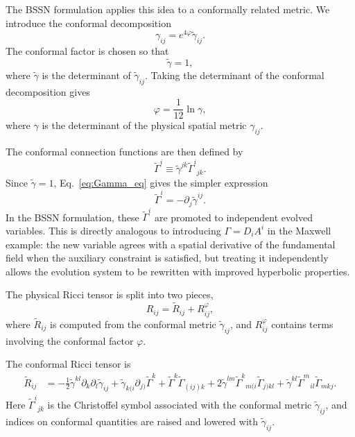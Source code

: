 The BSSN formulation applies this idea to a conformally related metric. We introduce the conformal decomposition
\begin{equation}
\gamma_{ij}
=
e^{4\varphi}\tilde{\gamma}_{ij}.
\end{equation}
The conformal factor is chosen so that
\begin{equation}
\tilde{\gamma}=1,
\end{equation}
where $\tilde{\gamma}$ is the determinant of $\tilde{\gamma}_{ij}$. Taking the determinant of the conformal decomposition gives
\begin{equation}
\varphi
=
\frac{1}{12}\ln\gamma,
\end{equation}
where $\gamma$ is the determinant of the physical spatial metric $\gamma_{ij}$.

The conformal connection functions are then defined by
\begin{equation}
\tilde{\Gamma}^i
\equiv
\tilde{\gamma}^{jk}\tilde{\Gamma}^i{}_{jk}.
\end{equation}
Since $\tilde{\gamma}=1$, Eq.~\eqref{eq:Gamma_eq} gives the simpler expression
\begin{equation}
\tilde{\Gamma}^i
=
-\partial_j\tilde{\gamma}^{ij}.
\end{equation}
In the BSSN formulation, these $\tilde{\Gamma}^i$ are promoted to independent evolved variables. This is directly analogous to introducing $\Gamma=D_iA^i$ in the Maxwell example: the new variable agrees with a spatial derivative of the fundamental field when the auxiliary constraint is satisfied, but treating it independently allows the evolution system to be rewritten with improved hyperbolic properties.

The physical Ricci tensor is split into two pieces,
\begin{equation}
R_{ij}
=
\tilde{R}_{ij}
+
R^{\varphi}_{ij},
\end{equation}
where $\tilde{R}_{ij}$ is computed from the conformal metric $\tilde{\gamma}_{ij}$, and $R^{\varphi}_{ij}$ contains terms involving the conformal factor $\varphi$.

The conformal Ricci tensor is
\begin{equation}
\begin{aligned}
\tilde{R}_{ij}
&=
-\frac{1}{2}\tilde{\gamma}^{kl}
\partial_k\partial_l \tilde{\gamma}_{ij}
+
\tilde{\gamma}_{k(i}\partial_{j)}\tilde{\Gamma}^{k}
+
\tilde{\Gamma}^{k}\tilde{\Gamma}_{(ij)k}
+
2\tilde{\gamma}^{lm}
\tilde{\Gamma}^{k}{}_{m(i}\tilde{\Gamma}_{j)kl}
+
\tilde{\gamma}^{kl}
\tilde{\Gamma}^{m}{}_{il}\tilde{\Gamma}_{mkj}.
\end{aligned}
\end{equation}
Here $\tilde{\Gamma}^{i}{}_{jk}$ is the Christoffel symbol associated with the conformal metric $\tilde{\gamma}_{ij}$, and indices on conformal quantities are raised and lowered with $\tilde{\gamma}_{ij}$.

